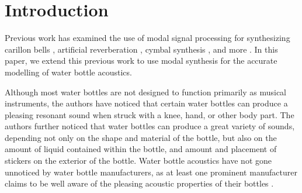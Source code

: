 \documentclass[twoside,a4paper]{article}
\title{\papertitle}
\affiliation{
\paperauthorA \, \thanks{}}
{\href{http://ccrma.stanford.edu}{Center for Computer Research in Music and Acoustics} \\ Stanford University \\ Palo Alto, CA \\ {\tt\{jatin|kermit|mrau\}@ccrma.stanford.edu}}
\newif\ifpdf
\begin{document}
\ifpdf %
  \DeclareGraphicsExtensions{.png,.jpg,.pdf}
\else  %
\fi

\maketitle
%
\begin{abstract}
We present a method for accurately synthesizing the acoustic response
of a water bottle using modal signal processing. We take extensive
measurements of two water bottles with considerations for how the level of water inside the bottles, amount of stickers attached to the exterior
of the bottles, and the method of striking the bottles affect their sound. We perform modal analysis of these measurements and implement  a real-time modal water bottle synthesizer.
\end{abstract}

\section{Introduction} \label{sec:intro}
%
Previous work has examined the use of modal signal processing
for synthesizing carillon bells \cite{canfielddafilou:werner:bellEffects:2017,
rau:das:canfielddafilou:carillon:2019}, artificial reverberation 
\cite{abel2014a}, cymbal synthesis \cite{travis_cymbals}, and more 
\cite{abel_kurt_modal,rocket-bells}. In this paper, we extend this previous
work to use modal synthesis for the accurate modelling of water bottle 
acoustics.

Although most water bottles are not designed to function primarily as musical
instruments, the authors have noticed that certain water bottles
can produce a pleasing resonant sound when struck with a knee, hand,
or other body part. The authors further noticed that water bottles can
produce a great variety of sounds, depending not only on the shape and
material of the bottle, but also on the amount of liquid contained
within the bottle, and amount and placement of stickers on the
exterior of the bottle. Water bottle acoustics have not gone unnoticed
by water bottle manufacturers, as at least one prominent manufacturer claims
to be well aware of the pleasing acoustic properties of their bottles
\cite{hydroflask_email}.
\end{document}
